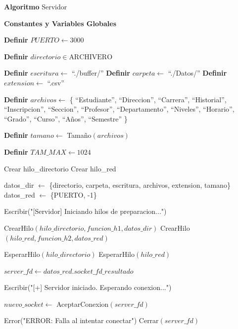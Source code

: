 \begin{tcolorbox}[colback=white, colframe=azul_unam, 
title=Pseudocódigo: servidor.c, breakable]

\textbf{Algoritmo} Servidor


\textbf{Constantes y Variables Globales}

\begin{algorithmic}[1]

\State \textbf{Definir} $PUERTO \gets 3000$

\State \textbf{Definir} $directorio \in \text{ARCHIVERO}$

\State \textbf{Definir} $escritura \gets$ ``./buffer/''
\State \textbf{Definir} $carpeta \gets$ ``./Datos/''
\State \textbf{Definir} $extension \gets$ ``.csv''

\State \textbf{Definir} $archivos \gets$ \{
``Estudiante'', ``Direccion'', ``Carrera'', ``Historial'',
``Inscripcion'', ``Seccion'', ``Profesor'', ``Departamento'',
``Niveles'', ``Horario'', ``Grado'', ``Curso'', ``Años'', ``Semestre''
\}

\State \textbf{Definir} $tamano \gets$ Tamaño$(archivos)$

\State \textbf{Definir} $TAM\_MAX \gets 1024$

\vspace{0.3cm}



\State Crear hilo\_directorio
\State Crear hilo\_red

\State datos\_dir $\gets$ \{directorio, carpeta, escritura, archivos, extension, tamano\}
\State datos\_red $\gets$ \{PUERTO, -1\}

\State Escribir("[Servidor] Iniciando hilos de preparacion...")

\State CrearHilo$(hilo\_directorio, funcion\_h1, datos\_dir)$
\State CrearHilo$(hilo\_red, funcion\_h2, datos\_red)$

\State EsperarHilo$(hilo\_directorio)$
\State EsperarHilo$(hilo\_red)$

\State $server\_fd \gets datos\_red.socket\_fd\_resultado$

\State Escribir("[+] Servidor iniciado. Esperando conexion...")

\State $nuevo\_socket \gets$ AceptarConexion$(server\_fd)$

    \State Error("ERROR: Falla al intentar conectar")
    \State Cerrar$(server\_fd)$
    \State \Return
\EndIf


\end{algorithmic}
\end{tcolorbox}
